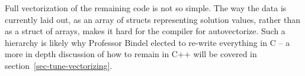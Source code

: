 Full vectorization of the remaining code is not so simple.  The way the data is 
currently laid out, as an array of structs representing solution values, rather
than as a struct of arrays, makes it hard for the compiler for autovectorize.
Such a hierarchy is likely why Professor Bindel elected to re-write everything
in C -- a more in depth discussion of how to remain in C++ will be covered in
section~\ref{sec-tune-vectorizing}.


